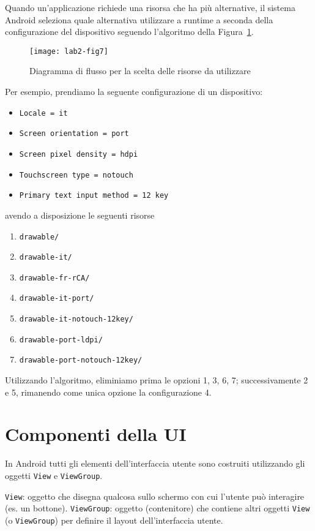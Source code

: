 Quando un'applicazione richiede una risorsa che ha più alternative, il sistema
Android seleziona quale alternativa utilizzare a runtime a seconda della
configurazione del dispositivo seguendo l'algoritmo della
Figura~\ref{img:lab2-fig7}.

\begin{figure}[h]
        \centering
        \texttt{[image: lab2-fig7]}
        \caption[Flowchart Risorse]{Diagramma di flusso per la scelta delle
risorse da utilizzare}\label{img:lab2-fig7}
\end{figure}

Per esempio, prendiamo la seguente configurazione di un dispositivo:
\begin{itemize}
\item \texttt{Locale = it}
\item \texttt{Screen orientation = port}
\item \texttt{Screen pixel density = hdpi}
\item \texttt{Touchscreen type = notouch}
\item \texttt{Primary text input method = 12 key}
\end{itemize}

avendo a disposizione le seguenti risorse

\begin{enumerate}
\item \texttt{drawable/}
\item \texttt{drawable-it/}
\item \texttt{drawable-fr-rCA/}
\item \texttt{drawable-it-port/}
\item \texttt{drawable-it-notouch-12key/}
\item \texttt{drawable-port-ldpi/}
\item \texttt{drawable-port-notouch-12key/}
\end{enumerate}

Utilizzando l'algoritmo, eliminiamo prima le opzioni 1, 3, 6, 7; successivamente
2 e 5, rimanendo come unica opzione la configurazione 4.

\section{Componenti della UI}

In Android tutti gli elementi dell'interfaccia utente sono costruiti utilizzando
gli oggetti \texttt{View} e \texttt{ViewGroup}.

\texttt{View}: oggetto che disegna qualcosa sullo schermo con cui l'utente può
interagire (es. un bottone).
\texttt{ViewGroup}: oggetto (contenitore) che contiene altri oggetti
\texttt{View} (o \texttt{ViewGroup}) per definire il layout dell'interfaccia
utente.

